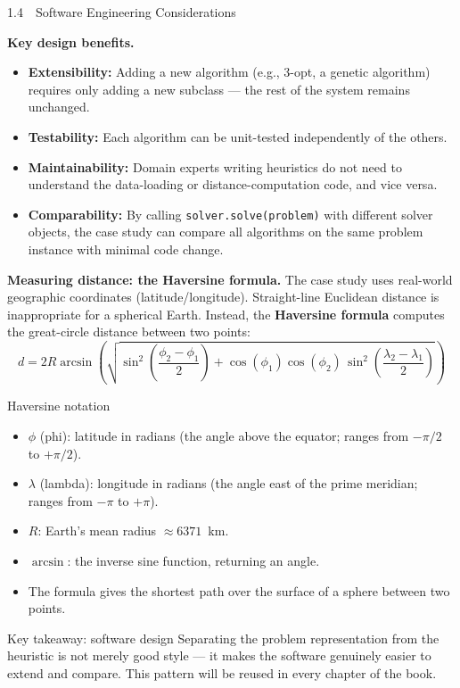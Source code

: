 \documentclass[aspectratio=169,10pt]{beamer}
\begin{document}
\begin{frame}[allowframebreaks]{1.4~~Software Engineering Considerations}
\framebreak

  \textbf{Key design benefits.}

  \begin{itemize}
    \item \textbf{Extensibility:} Adding a new algorithm (e.g., 3-opt,
      a genetic algorithm) requires only adding a new subclass ---
      the rest of the system remains unchanged.
    \item \textbf{Testability:} Each algorithm can be unit-tested
      independently of the others.
    \item \textbf{Maintainability:} Domain experts writing heuristics do
      not need to understand the data-loading or distance-computation
      code, and vice versa.
    \item \textbf{Comparability:} By calling
      \texttt{solver.solve(problem)} with different solver objects, the
      case study can compare all algorithms on the same problem instance
      with minimal code change.
  \end{itemize}

  \medskip
  \textbf{Measuring distance: the Haversine formula.}
  The case study uses real-world geographic coordinates
  (latitude/longitude).  Straight-line Euclidean distance is
  inappropriate for a spherical Earth.  Instead, the
  \textbf{Haversine formula} computes the great-circle distance between
  two points:
  \[
    d = 2R \arcsin\!\left(
        \sqrt{
          \sin^2\!\left(\frac{\phi_2 - \phi_1}{2}\right)
          +
          \cos(\phi_1)\cos(\phi_2)\,
          \sin^2\!\left(\frac{\lambda_2 - \lambda_1}{2}\right)
        }
      \right)
  \]

  \begin{block}{Haversine notation}
    \begin{itemize}
      \item $\phi$ (phi): latitude in radians (the angle above the
        equator; ranges from $-\pi/2$ to $+\pi/2$).
      \item $\lambda$ (lambda): longitude in radians (the angle east of
        the prime meridian; ranges from $-\pi$ to $+\pi$).
      \item $R$: Earth's mean radius $\approx 6371$~km.
      \item $\arcsin$: the inverse sine function, returning an angle.
      \item The formula gives the shortest path over the surface of a
        sphere between two points.
    \end{itemize}
  \end{block}

  \begin{alertblock}{Key takeaway: software design}
    Separating the problem representation from the heuristic is not
    merely good style --- it makes the software genuinely easier to
    extend and compare.  This pattern will be reused in every chapter
    of the book.
  \end{alertblock}

\end{frame}
\end{document}
